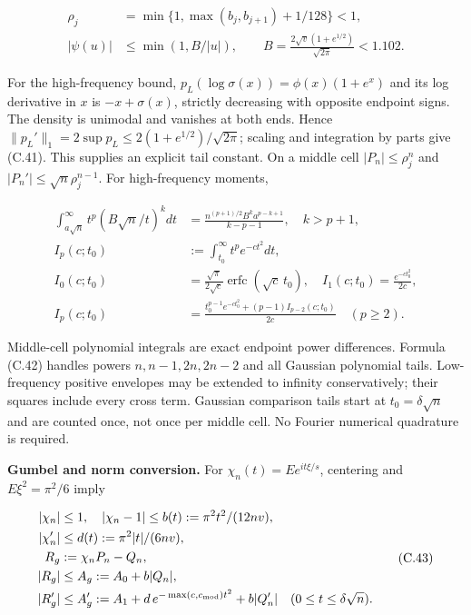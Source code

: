 \documentclass{article}
\begin{document}
\[
\begin{aligned}
\rho_j&=\min\{1,\max(b_j,b_{j+1})+1/128\}<1,\\
|\psi(u)|&\le \min(1,B/|u|),\qquad
B=\frac{2\sqrt v(1+e^{1/2})}{\sqrt{2\pi}}<1.102.
\end{aligned}
\tag{C.41}
\]

For the high-frequency bound, \(p_L(\log\sigma(x))=\phi(x)(1+e^x)\) and
its log derivative in \(x\) is \(-x+\sigma(x)\), strictly decreasing
with opposite endpoint signs. The density is unimodal and vanishes at
both ends. Hence \(\|p_L'\|_1=2\sup p_L\le2(1+e^{1/2})/\sqrt{2\pi}\);
scaling and integration by parts give (C.41). This supplies an explicit
tail constant. On a middle cell \(|P_n|\le\rho_j^n\) and
\(|P_n'|\le\sqrt n\rho_j^{n-1}\). For high-frequency moments,

\[
\begin{aligned}
\int_{a\sqrt n}^{\infty}t^p(B\sqrt n/t)^kdt
&=\frac{n^{(p+1)/2}B^ka^{p-k+1}}{k-p-1},\quad k>p+1,\\
I_p(c;t_0)&:=\int_{t_0}^{\infty}t^pe^{-ct^2}dt,\\
I_0(c;t_0)&=\frac{\sqrt\pi}{2\sqrt c}\operatorname{erfc}(\sqrt c\,t_0),
\quad I_1(c;t_0)=\frac{e^{-ct_0^2}}{2c},\\
I_p(c;t_0)&=\frac{t_0^{p-1}e^{-ct_0^2}+(p-1)I_{p-2}(c;t_0)}{2c}\quad(p\ge2).
\end{aligned}
\tag{C.42}
\]

Middle-cell polynomial integrals are exact endpoint power differences.
Formula (C.42) handles powers \(n,n-1,2n,2n-2\) and all Gaussian
polynomial tails. Low-frequency positive envelopes may be extended to
infinity conservatively; their squares include every cross term.
Gaussian comparison tails start at \(t_0=\delta\sqrt n\) and are counted
once, not once per middle cell. No Fourier numerical quadrature is
required.

\textbf{Gumbel and norm conversion.} For \(\chi_n(t)=Ee^{it\xi/s}\),
centering and \(E\xi^2=\pi^2/6\) imply

\[
\begin{aligned}
|\chi_n|&\le1,\quad |\chi_n-1|\le b(t):=\pi^2t^2/(12nv),\\
|\chi_n'|&\le d(t):=\pi^2|t|/(6nv),\\
R_g&:=\chi_nP_n-Q_n,\\
|R_g|&\le A_g:=A_0+b|Q_n|,\\
|R_g'|&\le A_g':=A_1+d\,e^{-\max(c,c_{\rm mod})t^2}+b|Q_n'|
\quad(0\le t\le\delta\sqrt n).
\end{aligned}
\tag{C.43}
\]
\end{document}

